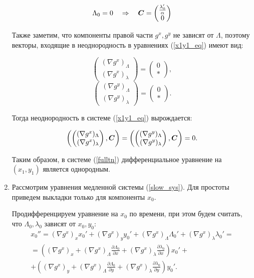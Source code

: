 \begin{enumerate}
$$\Lambda_0 = 0 \quad \Rightarrow \quad \boldsymbol{C} = \begin{pmatrix} \frac{\lambda_0'}{\alpha} \\ 0 \end{pmatrix}$$

Также заметим, что компоненты правой части $g^x, g^y$ не зависят от $\Lambda$, поэтому векторы, входящие в неоднородность в уравнениях (\ref{x1y1_eq}) имеют вид:

$$\begin{pmatrix} (\nabla g^x)_\Lambda \\ (\nabla g^x)_\lambda \end{pmatrix} = \begin{pmatrix} 0 \\ * \end{pmatrix},$$
$$\begin{pmatrix} (\nabla g^y)_\Lambda \\ (\nabla g^y)_\lambda \end{pmatrix} = \begin{pmatrix} 0 \\ * \end{pmatrix}.$$

Тогда неоднородность в системе (\ref{x1y1_eq}) вырождается:

$$\left( \begin{pmatrix} (\nabla g^x)_\Lambda \\ (\nabla g^x)_\lambda \end{pmatrix},\boldsymbol{C} \right) = \left( \begin{pmatrix} (\nabla g^y)_\Lambda \\ (\nabla g^y)_\lambda \end{pmatrix},\boldsymbol{C} \right) = 0.$$

Таким образом, в системе (\ref{fulltn}) дифференциальное уравнение на $(x_1,y_1)$ является однородным.

\item 

Рассмотрим уравнения медленной системы (\ref{slow_sys}). Для простоты приведем выкладки только для компоненты $x_0$.

Продифференцируем уравнение на $x_0$ по времени, при этом будем считать, что $\Lambda_0, \lambda_0$ зависят от $x_0,y_0$:
\begin{multline}
x_0'' = (\nabla g^x)_x x_0' + (\nabla g^x)_y y_0' + (\nabla g^x)_\Lambda \Lambda_0' + (\nabla g^x)_\lambda \lambda_0' = \\
= 
\left( (\nabla g^x)_x + (\nabla g^x)_\Lambda\frac{\partial \Lambda_0}{\partial x} + (\nabla g^x)_\lambda\frac{\partial \lambda_0}{\partial x} \right) x_0' +\\
+\left( (\nabla g^x)_y + (\nabla g^x)_\Lambda\frac{\partial \Lambda_0}{\partial y} + (\nabla g^x)_\lambda\frac{\partial \lambda_0}{\partial y} \right) y_0'.
\label{xdd_eq}
\end{multline}


\end{enumerate}
